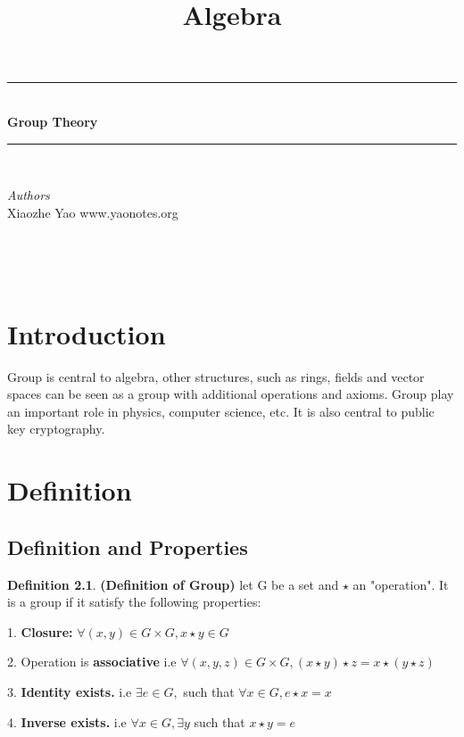 \documentclass[12pt,openany]{book}
\title{Algebra}
\theoremstyle{definition}
\newtheorem{defi}{Definition}[section]
\theoremstyle{definition}
\newcommand{\HRule}{\rule{\linewidth}{0.5mm}} %
\begin{document}
 

\begin{center}
\HRule \\[0.4cm]
{ \huge \bfseries Group Theory}\\[0.4cm] %
\HRule \\[1.5cm]
\begin{minipage}{0.4\textwidth}
\begin{flushleft} \large
\emph{Authors}\\
Xiaozhe Yao \newline
www.yaonotes.org \newline
\end{flushleft}
\end{minipage}
~
\begin{minipage}{0.4\textwidth}
\begin{flushright} \large

\end{flushright}
\end{minipage}\\[0.5cm]
\end{center}

\chapter{Introduction}

Group is central to algebra, other structures, such as rings, fields and vector spaces can be seen as a group with additional operations and axioms. Group play an important role in physics, computer science, etc. It is also central to public key cryptography.

\chapter{Definition}

\section{Definition and Properties}

\begin{defi}
\textbf{(Definition of Group)} let G be a set and $\star$ an "operation". It is a group if it satisfy the following properties:

1. \textbf{Closure:} $\forall (x,y) \in G \times G, x \star y \in G $

2. Operation is \textbf{associative} i.e $\forall (x, y, z) \in G \times G, (x \star y) \star z = x \star (y \star z) $

3. \textbf{Identity exists.} i.e $\exists e \in G,$ such that $\forall x \in G, e \star x = x $

4. \textbf{Inverse exists.} i.e $\forall x \in G, \exists y$ such that $x \star y = e$
\end{defi}
\end{document}
